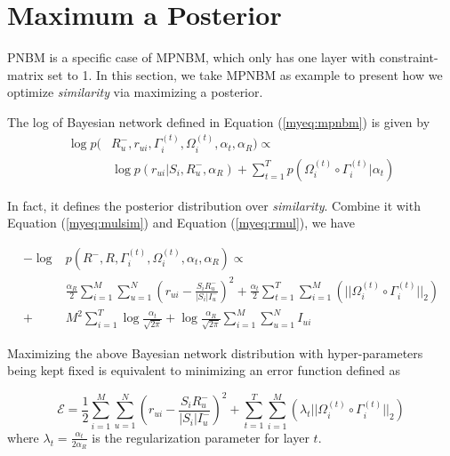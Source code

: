 \documentclass[conference]{IEEEtran}
\begin{document}
\section{Maximum a Posterior}
\label{map-1}
PNBM is a specific case of MPNBM, which only has one layer with constraint-matrix set to 1. In this section, we take MPNBM as example to present how we optimize \emph{similarity} via maximizing a posterior.

The log of Bayesian network defined in Equation (\ref{myeq:mpnbm}) is given by
\begin{equation}\label{myeq:logmpnbm}
\begin{split}
\log p( & R_u^{-}, r_{ui}, \Gamma^{(t)}_{i}, \Omega^{(t)}_{i}, \alpha_t, \alpha_R) \propto \\
& \log p(r_{ui}|S_i,R_u^{-},\alpha_R) + \sum_{t=1}^{T}  p(\Omega^{(t)}_{i} \circ \Gamma^{(t)}_{i} |\alpha_t)
\end{split}
\end{equation}

In fact, it defines the posterior distribution over \emph{similarity}.
Combine it with Equation (\ref{myeq:mulsim}) and Equation (\ref{myeq:rmul}), we have

\begin{equation}\label{myeq:logmpnbm2}
\begin{split}
-  \log &  p(R^{-}, R, \Gamma^{(t)}_{i}, \Omega^{(t)}_{i}, \alpha_t, \alpha_R) \propto \\
& \frac{\alpha_R}{2} \sum_{i=1}^M\sum_{u=1}^N(r_{ui}-\frac{S_iR_u^-}{|S_i|I_u^-})^2+\frac{\alpha_t}{2}\sum_{t=1}^{T}\sum_{i=1}^M(||\Omega^{(t)}_{i} \circ \Gamma^{(t)}_{i}||_2)\\
+& M^2 \sum_{i=1}^T\log \frac{\alpha_t}{\sqrt{2\pi}} + \log \frac{\alpha_R}{\sqrt{2\pi}} \sum_{i=1}^M\sum_{u=1}^NI_{ui}
\end{split}
\end{equation}

Maximizing the above Bayesian network distribution with hyper-parameters being kept fixed is equivalent to minimizing an error function defined as

\begin{equation}\label{myeq:errfunc}
\mathcal{E} = \frac{1}{2} \sum_{i=1}^M\sum_{u=1}^N(r_{ui}-\frac{S_iR_u^-}{|S_i|I_u^-})^2+\sum_{t=1}^{T}\sum_{i=1}^M(\lambda_t ||\Omega^{(t)}_{i} \circ \Gamma^{(t)}_{i}||_2)
\end{equation}
where $\lambda_t = \frac{\alpha_t}{2\alpha_R}$ is the regularization parameter for layer $t$.
\end{document}
